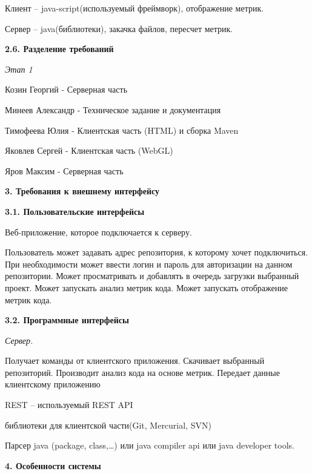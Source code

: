 \documentclass[a4paper,12pt]{article}
\begin{document}
		Клиент – java-script(используемый фреймворк), отображение метрик.
		
		Сервер – java(библиотеки), закачка файлов, пересчет метрик.
		\newline
		
	\textbf{2.6. Разделение требований}
	
		\textit{Этап 1}
		
		Козин Георгий - Серверная часть
		
		Минеев Александр - Техническое задание и документация
		
		Тимофеева Юлия - Клиентская часть (HTML) и сборка Maven
		
		Яковлев Сергей - Клиентская часть (WebGL)
		
		Яров Максим - Серверная часть
\maketitle
\newpage
\textbf{3. Требования к внешнему интерфейсу}
\newline

	\textbf{3.1. Пользовательские интерфейсы}
	
	Веб-приложение, которое подключается к серверу.
	
	Пользователь может задавать адрес репозитория, к которому хочет подключиться. При необходимости может ввести логин и пароль для авторизации на данном репозитории. Может просматривать и добавлять в очередь загрузки выбранный проект. Может запускать анализ метрик кода. Может запускать отображение метрик кода.
	\newline
	
	\textbf{3.2. Программные интерфейсы}
	
		\textit{Сервер.}
		
		Получает команды от клиентского приложения. Скачивает выбранный репозиторий. Производит анализ кода на основе метрик. Передает данные клиентскому приложению
		
		REST – используемый REST API
		
		библиотеки для клиентской части(Git, Mercurial, SVN)
	
		Парсер java (package, class,…) или java compiler api или java developer tools.
		
\maketitle
\newpage
\textbf{4. Особенности системы}
\newline
\end{document}
